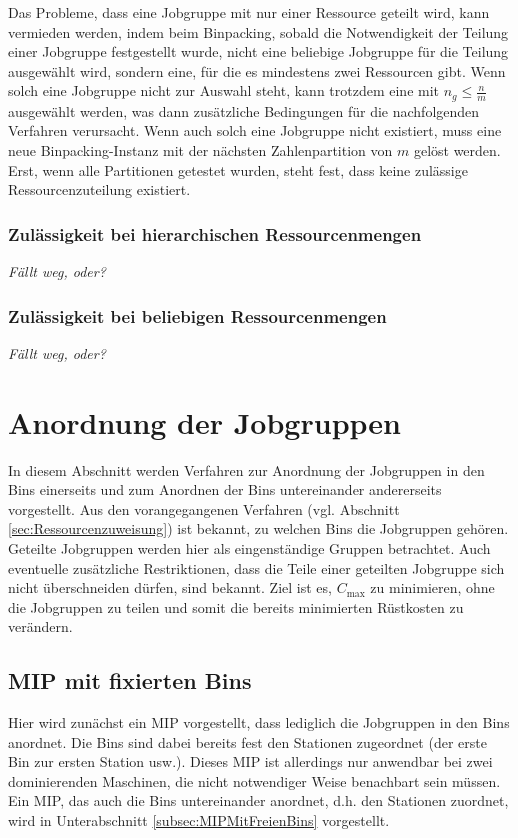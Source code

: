 \documentclass{scrreprt}
\begin{document}
Das Probleme, dass eine Jobgruppe mit nur einer Ressource geteilt wird, kann vermieden werden, indem beim Binpacking, 
sobald die Notwendigkeit der Teilung einer Jobgruppe festgestellt wurde,
nicht eine beliebige Jobgruppe für die Teilung ausgewählt wird, sondern eine, für die es mindestens zwei Ressourcen gibt.
Wenn solch eine Jobgruppe nicht zur Auswahl steht, kann trotzdem eine mit $n_g\leq\frac{n}{m}$ ausgewählt werden, was dann zusätzliche Bedingungen für die
nachfolgenden Verfahren verursacht. Wenn auch solch eine Jobgruppe nicht existiert, muss eine neue Binpacking-Instanz mit der nächsten Zahlenpartition von $m$ gelöst werden.
Erst, wenn alle Partitionen getestet wurden, steht fest, dass keine zulässige Ressourcenzuteilung existiert.

\subsubsection{Zulässigkeit bei hierarchischen Ressourcenmengen}
\textit{Fällt weg, oder?}

\subsubsection{Zulässigkeit bei beliebigen Ressourcenmengen}
\textit{Fällt weg, oder?}


\section{Anordnung der Jobgruppen}
\label{sec:AnordnungDerJobgruppen}
In diesem Abschnitt werden Verfahren zur Anordnung der Jobgruppen in den Bins einerseits und
zum Anordnen der Bins untereinander andererseits vorgestellt.
Aus den vorangegangenen Verfahren (vgl. Abschnitt \ref{sec:Ressourcenzuweisung}) ist bekannt, zu welchen Bins die Jobgruppen gehören.
Geteilte Jobgruppen werden hier als eingenständige Gruppen betrachtet.
Auch eventuelle zusätzliche Restriktionen, dass die Teile einer geteilten Jobgruppe sich nicht überschneiden dürfen, sind bekannt.
Ziel ist es, $C_{\max}$ zu minimieren, ohne die Jobgruppen zu teilen und somit die bereits minimierten Rüstkosten zu verändern.


\subsection{MIP mit fixierten Bins}
\label{subsec:MIPMitFixiertenBins}
Hier wird zunächst ein MIP vorgestellt, dass lediglich die Jobgruppen in den Bins anordnet.
Die Bins sind dabei bereits fest den Stationen zugeordnet (der erste Bin zur ersten Station usw.).
Dieses MIP ist allerdings nur anwendbar bei zwei dominierenden Maschinen, die nicht notwendiger Weise benachbart sein müssen.
Ein MIP, das auch die Bins untereinander anordnet, d.h. den Stationen zuordnet, wird in Unterabschnitt \ref{subsec:MIPMitFreienBins} vorgestellt.
\end{document}
